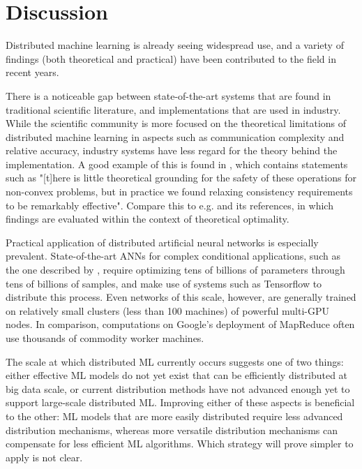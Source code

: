 \section{Discussion}
Distributed machine learning is already seeing widespread use, and a variety of findings (both theoretical and practical) have been contributed to the field in recent years.

There is a noticeable gap between state-of-the-art systems that are found in traditional scientific literature, and implementations that are used in industry. While the scientific community is more focused on the theoretical limitations of distributed machine learning in aspects such as communication complexity and relative accuracy, industry systems have less regard for the theory behind the implementation. A good example of this is found in \citep{DistBelief2012}, which contains statements such as "[t]here is little theoretical grounding for the safety of these operations for non-convex problems, but in practice we found relaxing consistency requirements to be remarkably effective". Compare this to e.g. \citep{Xing16} and its references, in which findings are evaluated within the context of theoretical optimality.

Practical application of distributed artificial neural networks is especially prevalent. State-of-the-art ANNs for complex conditional applications, such as the one described by \citet{Shazeer2017}, require optimizing tens of billions of parameters through tens of billions of samples, and make use of systems such as Tensorflow\citep{Tensorflow2015}\citep{Tensorflow2016} to distribute this process. Even networks of this scale, however, are generally trained on relatively small clusters (less than 100 machines) of powerful multi-GPU nodes. In comparison, computations on Google's deployment of MapReduce\citep{MapReduce} often use thousands of commodity worker machines.

The scale at which distributed ML currently occurs suggests one of two things: either effective ML models do not yet exist that can be efficiently distributed at big data scale, or current distribution methods have not advanced enough yet to support large-scale distributed ML. Improving either of these aspects is beneficial to the other: ML models that are more easily distributed require less advanced distribution mechanisms, whereas more versatile distribution mechanisms can compensate for less efficient ML algorithms. Which strategy will prove simpler to apply is not clear.